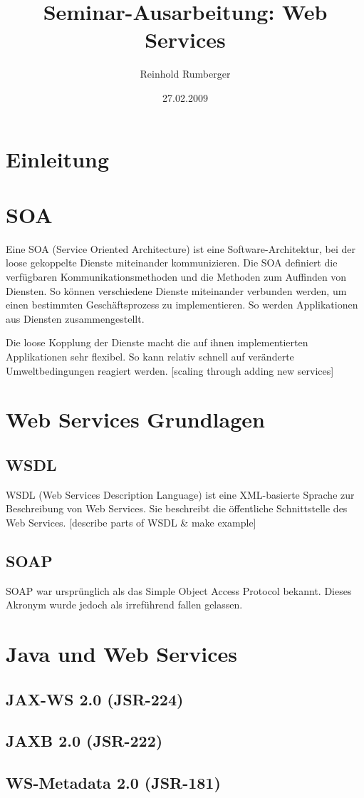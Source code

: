 \documentclass{llncs}
\author{Reinhold Rumberger}
\institute{Institute of Architecture of Application Systems (IAAS)
  \email{rumberrd@studi.informatik.uni-stuttgart.de}}
\title{Seminar-Ausarbeitung: Web Services}
\date{27.02.2009}
\begin{document}
  \frontmatter
  \pagestyle{headings}

  \maketitle
  \tableofcontents
  \newpage

  \section{Einleitung}

  \section{SOA}
  Eine \glqq{}SOA\grqq{} (Service Oriented Architecture) ist eine Software-Architektur, bei der loose gekoppelte Dienste miteinander kommunizieren. Die SOA definiert die verfügbaren Kommunikationsmethoden und die Methoden zum Auffinden von Diensten. So können verschiedene Dienste miteinander verbunden werden, um einen bestimmten Geschäftsprozess zu implementieren. So werden Applikationen aus Diensten zusammengestellt.

  Die loose Kopplung der Dienste macht die auf ihnen implementierten Applikationen sehr flexibel. So kann relativ schnell auf veränderte Umweltbedingungen reagiert werden. [scaling through adding new services]

  \section{Web Services Grundlagen}

  \subsection{WSDL}
  WSDL (Web Services Description Language) ist eine XML-basierte Sprache zur Beschreibung von Web Services. Sie beschreibt die öffentliche Schnittstelle des Web Services.
  [describe parts of WSDL \& make example]

  \subsection{SOAP}
  SOAP war ursprünglich als das \glqq{}Simple Object Access Protocol\grqq{} bekannt. Dieses Akronym wurde jedoch als irreführend fallen gelassen.

  \section{Java und Web Services}

  \subsection{JAX-WS 2.0 (JSR-224)}

  \subsection{JAXB 2.0 (JSR-222)}

  \subsection{WS-Metadata 2.0 (JSR-181)}
\end{document}
